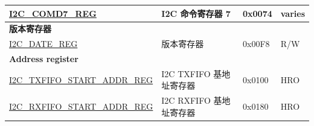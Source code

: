 \begin{longtable}{ | p{6cm} | p{7cm} | p{1.3cm} | p{1cm} | }
\hyperref[regdesc:I2CCOMD7REG]{I2C\_COMD7\_REG} & I2C 命令寄存器 7 & 0x0074 & varies \\ \hline
\multicolumn{4}{|l|}{\textbf{版本寄存器}} \\ \hline
\hyperref[regdesc:I2CDATEREG]{I2C\_DATE\_REG} & 版本寄存器 & 0x00F8 & R/W \\ \hline
\multicolumn{4}{|l|}{\textbf{Address register}} \\ \hline
\hyperref[regdesc:I2CTXFIFOSTARTADDRREG]{I2C\_TXFIFO\_START\_ADDR\_REG} & I2C TXFIFO 基地址寄存器 & 0x0100 & HRO \\ \hline
\hyperref[regdesc:I2CRXFIFOSTARTADDRREG]{I2C\_RXFIFO\_START\_ADDR\_REG} & I2C RXFIFO 基地址寄存器 & 0x0180 & HRO \\ \hline
\end{longtable}
